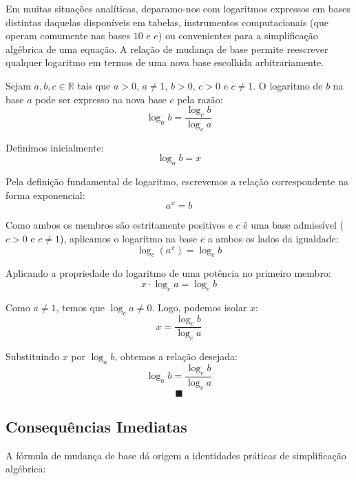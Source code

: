 \documentclass[12pt,a4paper]{report}
\begin{document}
	Em muitas situações analíticas, deparamo-nos com logaritmos expressos em bases distintas daquelas disponíveis em tabelas, instrumentos computacionais (que operam comumente nas bases $10$ e $e$) ou convenientes para a simplificação algébrica de uma equação. A relação de mudança de base permite reescrever qualquer logaritmo em termos de uma nova base escolhida arbitrariamente.
	
	\begin{destaque}
		Sejam $a, b, c \in \mathbb{R}$ tais que $a > 0$, $a \neq 1$, $b > 0$, $c > 0$ e $c \neq 1$. O logaritmo de $b$ na base $a$ pode ser expresso na nova base $c$ pela razão:
		$$\log_a b = \frac{\log_c b}{\log_c a}$$
	\end{destaque}
	
	\newpage
	
	\begin{destaque}[Demonstração:]
		Definimos inicialmente:
		$$\log_a b = x$$
		
		Pela definição fundamental de logaritmo, escrevemos a relação correspondente na forma exponencial:
		$$a^x = b$$
		
		Como ambos os membros são estritamente positivos e $c$ é uma base admissível ($c > 0$ e $c \neq 1$), aplicamos o logaritmo na base $c$ a ambos os lados da igualdade:
		$$\log_c (a^x) = \log_c b$$
		
		Aplicando a propriedade do logaritmo de uma potência no primeiro membro:
		$$x \cdot \log_c a = \log_c b$$
		
		Como $a \neq 1$, temos que $\log_c a \neq 0$. Logo, podemos isolar $x$:
		$$x = \frac{\log_c b}{\log_c a}$$
		
		Substituindo $x$ por $\log_a b$, obtemos a relação desejada:
		$$\log_a b = \frac{\log_c b}{\log_c a}$$
		$$\blacksquare$$
	\end{destaque}
	
	\newpage
	
	\subsection{Consequências Imediatas}
	
	A fórmula de mudança de base dá origem a identidades práticas de simplificação algébrica:
	
\end{document}
